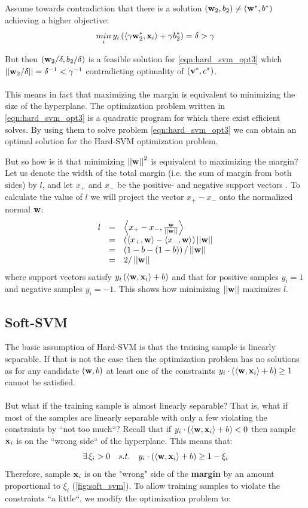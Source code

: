 Assume towards contradiction that there is a solution $\left(\mathbf{w}_2,b_2\right)\neq \left(\mathbf{w}^*,b^*\right)$ achieving a higher objective: $$\underset{i}{min}\, y_i\left(\left\langle \gamma \mathbf{w}_2^*,\mathbf{x}_i\right\rangle+\gamma b_2^*\right) = \delta > \gamma$$

But then $\left(\mathbf{w}_2/\delta, b_2/\delta\right)$ is a feasible solution for \ref{eqn:hard_svm_opt3} which $\left|\left| \mathbf{w}_2/\delta\right|\right|=\delta^{-1} < \gamma^{-1}$ contradicting optimality of $\left(\mathbf{v}^*,c^*\right)$.
\\~\\
This means in fact that maximizing the margin is equivalent to minimizing the size of the hyperplane. The optimization problem written in \ref{eqn:hard_svm_opt3} is a quadratic program for which there exist efficient solves. By using them to solve problem \ref{eqn:hard_svm_opt3} we can obtain an optimal solution for the Hard-SVM optimization problem.

\begin{remark}
	But so how is it that minimizing $\left|\left| \mathbf{w}\right|\right|^2$ is equivalent to maximizing the margin? Let us denote the width of the total margin (i.e. the sum of margin from both sides) by $l$, and let $x_{+}$ and $x_{-}$ be the positive- and negative support vectors . To calculate the value of $l$ we will project the vector $x_{+} - x_{-}$ onto the normalized normal $\mathbf{w}$: 
	$$\begin{array}{ccl}
		l& = & \left\langle x_{+} - x_{-},\frac{\mathbf{w}}{\left|\left| \mathbf{w}\right|\right|}\right\rangle\\
		& = & \left(\left\langle x_{+},\mathbf{w}\right\rangle-\left\langle x_{-},\mathbf{w}\right\rangle\right)\left|\left| \mathbf{w}\right|\right|\\
		& = & \left(1-b-\left(1-b\right)\right)/\left|\left| \mathbf{w}\right|\right|\\
		& = & 2/\left|\left| \mathbf{w}\right|\right|
	\end{array}$$
	where support vectors satisfy $y_i\left(\left\langle \mathbf{w},\mathbf{x}_i\right\rangle+b\right)$ and that for positive samples $y_i=1$ and negative samples $y_i=-1$. This shows how minimizing $\left|\left| \mathbf{w}\right|\right|$ maximizes $l$.
\end{remark}


\subsection{Soft-SVM}
The basic assumption of Hard-SVM is that the training sample is linearly separable. If that is not the case then the optimization problem has no solutions as for any candidate $\left(\mathbf{w},b\right)$ at least one of the constraints $y_i\cdot\left(\left\langle \mathbf{w},\mathbf{x}_i\right\rangle+b\right)\geq 1$ cannot be satisfied.
\\~\\
But what if the training sample is almost linearly separable? That is, what if most of the samples are linearly separable with only a few violating the constraints by ``not too much``? Recall that if $y_i\cdot\left(\left\langle \mathbf{w},\mathbf{x}_i\right\rangle+b\right)<0$ then sample $\mathbf{x}_i$ is on the ``wrong side`` of the hyperplane. This means that: $$\exists \,\xi_i> 0\quad s.t.\quad y_i\cdot\left(\left\langle \mathbf{w},\mathbf{x}_i\right\rangle+b\right) \geq 1-\xi_i $$ Therefore, sample $\mathbf{x}_i$ is on the "wrong" side of the \textbf{margin} by an amount proportional to $\xi_i$ (\autoref{fig:soft_svm}). To allow training samples to violate the constraints ``a little``, we modify the optimization problem to:

